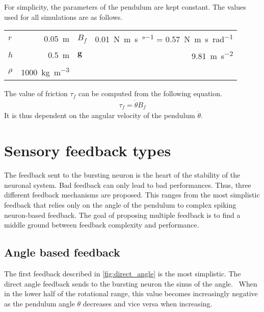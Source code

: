 For simplicity, the parameters of the pendulum are kept constant. The values used for all simulations are as follows.
{

\large\centering
\begin{tabular}{lr|lr}
    $r$     & \qty{0.05}{\meter}                  & $B_f$    & \qty{0.01}{\newton\meter\second\per\degree} = \qty{0.57}{\newton\meter\second\per\radian}\\
    $h$     & \qty{0.5}{\meter}                   & $\mathbf{g}$    & \qty{9.81}{\meter\per\second\squared}\\
    $\rho$  & \qty{1000}{\kg\per\cubic\meter}     &               & \\
\end{tabular}

}

The value of friction $\tau_f$ can be computed from the following equation.
\begin{align}
    \tau_f = \dot{\theta}B_f
\end{align}
It is thus dependent on the angular velocity of the pendulum $\dot{\theta}$.

\section{Sensory feedback types}

The feedback sent to the bursting neuron is the heart of the stability of the neuronal system.
Bad feedback can only lead to bad performances.
Thus, three different feedback mechanisms are proposed.
This ranges from the most simplistic feedback that relies only on the angle of the pendulum to complex spiking neuron-based feedback.
The goal of proposing multiple feedback is to find a middle ground between feedback complexity and performance.

\subsection{Angle based feedback}

The first feedback described in \cref{fig:direct_angle} is the most simplistic.
The direct angle feedback sends to the bursting neuron the sinus of the angle. 
When in the lower half of the rotational range, this value becomes increasingly negative as the pendulum angle $\theta$ decreases and vice versa when increasing.

